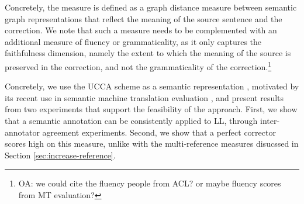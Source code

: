 \documentclass[letter,11pt]{article}
\newcommand{\oa}[1]{\footnote{\color{red}OA: #1}}
\begin{document}
		Concretely, the measure is defined as a graph distance measure between
		semantic graph representations that reflect the meaning of the source
		sentence and the correction.
		We note that such a measure needs to be complemented with an additional
		measure of fluency or grammaticality, as it only captures
		the faithfulness dimension, namely the extent to which
		the meaning of the source is preserved in the correction,
		and not the grammaticality of the correction.\oa{we could cite the fluency people from ACL? or maybe fluency scores from MT evaluation?}
		
		Concretely,
		we use the UCCA scheme as a semantic representation \cite{abend2013universal}, motivated by
		its recent use in semantic machine translation evaluation \cite{birch2016hume},
		and present results from two experiments that support the feasibility of the approach.
		First, we show that a semantic annotation can be consistently applied to LL,
		through inter-annotator agreement experiments.
		Second, we show that a perfect corrector scores high on this measure, unlike with
		the multi-reference measures disucssed in Section \ref{sec:increase-reference}.
		
		
		
\end{document}
